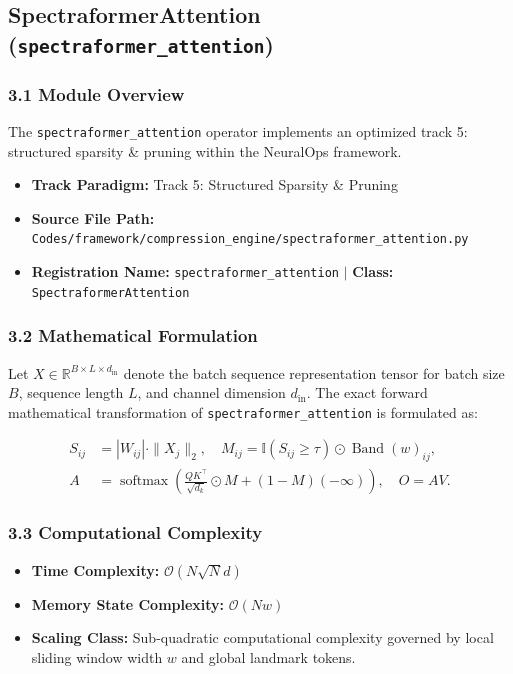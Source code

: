 \subsection{SpectraformerAttention (\texttt{spectraformer\_attention})}
\label{sec:app_module_spectraformer\_attention}

\subsubsection*{3.1 Module Overview}
The \texttt{spectraformer\_attention} operator implements an optimized track 5: structured sparsity \& pruning within the NeuralOps framework.
\begin{itemize}
    \item \textbf{Track Paradigm:} Track 5: Structured Sparsity & Pruning
    \item \textbf{Source File Path:} \texttt{Codes/framework/compression\_engine/spectraformer\_attention.py}
    \item \textbf{Registration Name:} \texttt{spectraformer\_attention} $\mid$ \textbf{Class:} \texttt{SpectraformerAttention}
\end{itemize}

\subsubsection*{3.2 Mathematical Formulation}
Let $X \in \mathbb{R}^{B \times L \times d_{\text{in}}}$ denote the batch sequence representation tensor for batch size $B$, sequence length $L$, and channel dimension $d_{\text{in}}$. The exact forward mathematical transformation of \texttt{spectraformer\_attention} is formulated as:

\begin{align}
S_{ij} &= |W_{ij}| \cdot \|X_j\|_2, \quad M_{ij} = \mathbb{I}(S_{ij} \ge \tau) \odot \operatorname{Band}(w)_{ij}, \\
A &= \operatorname{softmax}\left(\frac{Q K^\top}{\sqrt{d_k}} \odot M + (1 - M)(-\infty)\right), \quad O = A V.
\end{align}


\subsubsection*{3.3 Computational Complexity}
\begin{itemize}
    \item \textbf{Time Complexity:} $\mathcal{O}(N \sqrt{N} d)$
    \item \textbf{Memory State Complexity:} $\mathcal{O}(N w)$
    \item \textbf{Scaling Class:} Sub-quadratic computational complexity governed by local sliding window width $w$ and global landmark tokens.
\end{itemize}

